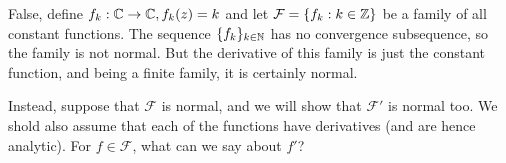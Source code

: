 \documentclass{homework}
\begin{document}
                                                                                                                                                            \begin{solution}
                                                                                                                                                            False, define $f_k:\mathbb{C}\to\mathbb{C}, f_k(z)=k$ and let $\mathcal{F}=\{f_k: k\in \mathbb{Z}\}$ be a family of all constant functions. The sequence $\{f_k\}_{k\in \mathbb{N}}$ has no convergence subsequence, so the family is not normal. But the derivative of this family is just the constant function, and being a finite family, it is certainly normal.

                                                                                                                                                            Instead, suppose that $\mathcal{F}$ is normal, and we will show that $\mathcal{F'}$ is normal too. We shold also assume that each of the functions have derivatives (and are hence analytic). For $f\in \mathcal{F}$, what can we say about $f'$?


\end{solution}
\end{document}
